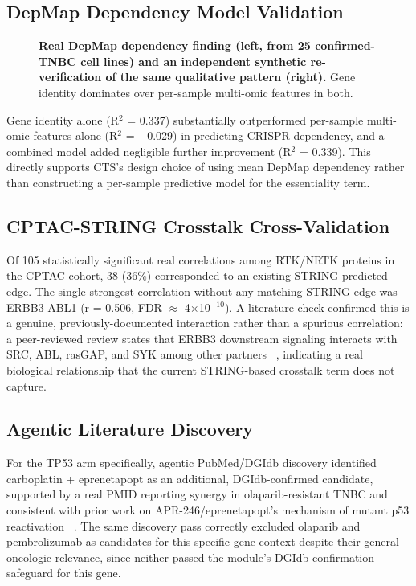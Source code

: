 \documentclass[10pt,letterpaper]{article}
\begin{document}
\subsection*{DepMap Dependency Model Validation}
\begin{figure}[!h]
\caption{\textbf{Real DepMap dependency finding (left, from 25 confirmed-TNBC cell lines) and an independent synthetic re-verification of the same qualitative pattern (right).} Gene identity dominates over per-sample multi-omic features in both.}
\label{fig2}
\end{figure}

Gene identity alone (R$^{2}$ = 0.337) substantially outperformed per-sample multi-omic features alone (R$^{2}$ = $-$0.029) in predicting CRISPR dependency, and a combined model added negligible further improvement (R$^{2}$ = 0.339). This directly supports CTS's design choice of using mean DepMap dependency rather than constructing a per-sample predictive model for the essentiality term.

\subsection*{CPTAC-STRING Crosstalk Cross-Validation}
Of 105 statistically significant real correlations among RTK/NRTK proteins in the CPTAC cohort, 38 (36\%) corresponded to an existing STRING-predicted edge. The single strongest correlation without any matching STRING edge was ERBB3-ABL1 (r = 0.506, FDR $\approx$ 4$\times$10$^{-10}$). A literature check confirmed this is a genuine, previously-documented interaction rather than a spurious correlation: a peer-reviewed review states that ERBB3 downstream signaling interacts with SRC, ABL, rasGAP, and SYK among other partners ~\cite{bib13}, indicating a real biological relationship that the current STRING-based crosstalk term does not capture.

\subsection*{Agentic Literature Discovery}
For the TP53 arm specifically, agentic PubMed/DGIdb discovery identified carboplatin + eprenetapopt as an additional, DGIdb-confirmed candidate, supported by a real PMID reporting synergy in olaparib-resistant TNBC and consistent with prior work on APR-246/eprenetapopt's mechanism of mutant p53 reactivation ~\cite{bib14}. The same discovery pass correctly excluded olaparib and pembrolizumab as candidates for this specific gene context despite their general oncologic relevance, since neither passed the module's DGIdb-confirmation safeguard for this gene.
\end{document}
